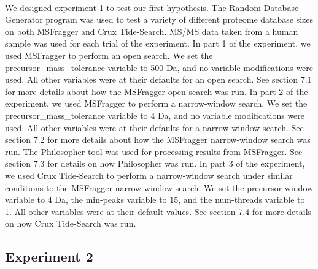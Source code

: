 \documentclass [11pt] {article}
\begin{document}
	\paragraph {}
	\qquad We designed experiment 1 to test our first hypothesis.  The Random Database Generator program was used to test a variety of different proteome database sizes on both MSFragger and Crux Tide-Search.  MS/MS data taken from a human sample was used for each trial of the experiment.  In part 1 of the experiment, we used MSFragger to perform an open search.  We set the precursor\_mass\_tolerance variable to 500 Da, and no variable modifications were used.  All other variables were at their defaults for an open search.  See section 7.1 for more details about how the MSFragger open search was run.  In part 2 of the experiment, we used MSFragger to perform a narrow-window search.  We set the precursor\_mass\_tolerance variable to 4 Da, and no variable modifications were used.  All other variables were at their defaults for a narrow-window search.  See section 7.2 for more details about how the MSFragger narrow-window search was run.  The Philosopher tool was used for processing results from MSFragger.  See section 7.3 for details on how Philosopher was run.  In part 3 of the experiment, we used Crux Tide-Search to perform a narrow-window search under similar conditions to the MSFragger narrow-window search.  We set the precursor-window variable to 4 Da, the min-peaks variable to 15, and the num-threads variable to 1.  All other variables were at their default values.  See section 7.4 for more details on how Crux Tide-Search was run.
	
	\subsection {Experiment 2}
	
\end{document}
